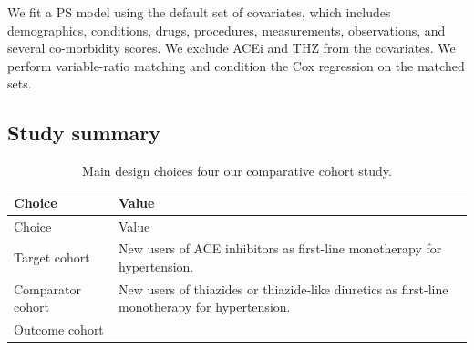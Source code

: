 \documentclass[11pt]{book}
\begin{document}
We fit a PS model using the default set of covariates, which includes
demographics, conditions, drugs, procedures, measurements, observations,
and several co-morbidity scores. We exclude ACEi and THZ from the
covariates. We perform variable-ratio matching \citep{rassen_2012} and
condition the Cox regression on the matched sets.

\subsection{Study summary}\label{study-summary}

\begin{longtable}[]{@{}ll@{}}
\caption{\label{tab:aceChoices} Main design choices four our comparative
cohort study.}\tabularnewline
\toprule
\begin{minipage}[b]{0.23\columnwidth}\raggedright\strut
Choice\strut
\end{minipage} & \begin{minipage}[b]{0.71\columnwidth}\raggedright\strut
Value\strut
\end{minipage}\tabularnewline
\midrule
\endfirsthead
\toprule
\begin{minipage}[b]{0.23\columnwidth}\raggedright\strut
Choice\strut
\end{minipage} & \begin{minipage}[b]{0.71\columnwidth}\raggedright\strut
Value\strut
\end{minipage}\tabularnewline
\midrule
\endhead
\begin{minipage}[t]{0.23\columnwidth}\raggedright\strut
Target cohort\strut
\end{minipage} & \begin{minipage}[t]{0.71\columnwidth}\raggedright\strut
New users of ACE inhibitors as first-line monotherapy for
hypertension.\strut
\end{minipage}\tabularnewline
\begin{minipage}[t]{0.23\columnwidth}\raggedright\strut
Comparator cohort\strut
\end{minipage} & \begin{minipage}[t]{0.71\columnwidth}\raggedright\strut
New users of thiazides or thiazide-like diuretics as first-line
monotherapy for hypertension.\strut
\end{minipage}\tabularnewline
\begin{minipage}[t]{0.23\columnwidth}\raggedright\strut
Outcome cohort\strut
\end{minipage} & \begin{minipage}[t]{0.71\columnwidth}\raggedright\strut

\end{minipage}
\end{longtable}
\end{document}
